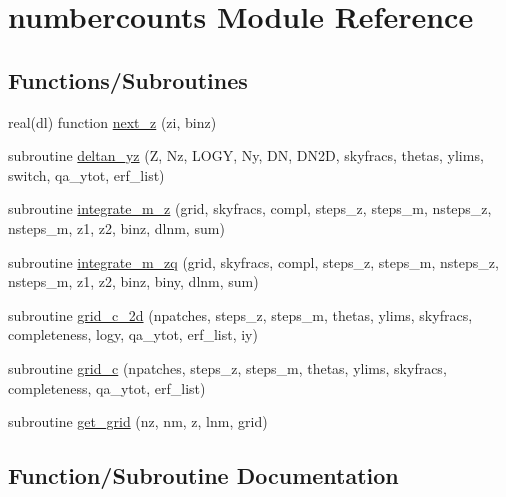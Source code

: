 \hypertarget{namespacenumbercounts}{}\section{numbercounts Module Reference}
\label{namespacenumbercounts}
\subsection*{Functions/\+Subroutines}
\begin{DoxyCompactItemize}
\item 
real(dl) function \mbox{\hyperlink{namespacenumbercounts_a9dd53df8344f5ed34b320cf13cd342b6}{next\+\_\+z}} (zi, binz)
\item 
subroutine \mbox{\hyperlink{namespacenumbercounts_a7e87a46c1e125cb57eff635630c88506}{deltan\+\_\+yz}} (Z, Nz, L\+O\+GY, Ny, DN, D\+N2D, skyfracs, thetas, ylims, switch, qa\+\_\+ytot, erf\+\_\+list)
\item 
subroutine \mbox{\hyperlink{namespacenumbercounts_ad089fdedf2c506bc8fc9dfb1ce45c024}{integrate\+\_\+m\+\_\+z}} (grid, skyfracs, compl, steps\+\_\+z, steps\+\_\+m, nsteps\+\_\+z, nsteps\+\_\+m, z1, z2, binz, dlnm, sum)
\item 
subroutine \mbox{\hyperlink{namespacenumbercounts_ab1013e4cf6773ad5eef3b128285b1dff}{integrate\+\_\+m\+\_\+zq}} (grid, skyfracs, compl, steps\+\_\+z, steps\+\_\+m, nsteps\+\_\+z, nsteps\+\_\+m, z1, z2, binz, biny, dlnm, sum)
\item 
subroutine \mbox{\hyperlink{namespacenumbercounts_a9147710c647a39e457fa04786c7c295d}{grid\+\_\+c\+\_\+2d}} (npatches, steps\+\_\+z, steps\+\_\+m, thetas, ylims, skyfracs, completeness, logy, qa\+\_\+ytot, erf\+\_\+list, iy)
\item 
subroutine \mbox{\hyperlink{namespacenumbercounts_ab87ce14039efd094615930acc710e6b2}{grid\+\_\+c}} (npatches, steps\+\_\+z, steps\+\_\+m, thetas, ylims, skyfracs, completeness, qa\+\_\+ytot, erf\+\_\+list)
\item 
subroutine \mbox{\hyperlink{namespacenumbercounts_a530ce747969dd91d2b57a90d658dbb62}{get\+\_\+grid}} (nz, nm, z, lnm, grid)
\end{DoxyCompactItemize}


\subsection{Function/\+Subroutine Documentation}
\mbox{\label{namespacenumbercounts_a7e87a46c1e125cb57eff635630c88506}} 
